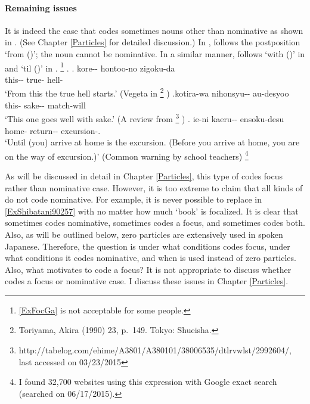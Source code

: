 \paragraph{Remaining issues}

It is indeed the case that
 codes sometimes nouns other than nominative
as shown in \Next.
(See Chapter \ref{Particles} for detailed discussion.)
In \Next[a],  follows the postposition  `from ()';
the noun cannot be nominative.
In a similar manner,
 follows  `with ()' in \Next[b] and
 `til ()' in \Next[c].%
 \footnote{\ref{ExFocGa} is not acceptable for some people.}
%
\ex.
 \ag. kore-- hontoo-no zigoku-da \\
      this-- true- hell- \\
      `From this the true hell starts.'
      \hfill{(Vegeta in %
      \footnote{
      Toriyama, Akira (1990)  23, p.~149. Tokyo: Shueisha.
      }
      )}
 \bg.\label{ExFocGa}kotira-wa nihonsyu-- au-desyoo \\
      this- sake-- match-will \\
      `This one goes well with sake.'
      \hfill{(A review from %
       \footnote{http://tabelog.com/ehime/A3801/A380101/38006535/dtlrvwlst/2992604/, last accessed on 03/23/2015}
      )}
  \bg. ie-ni kaeru-- ensoku-desu \\
       home- return-- excursion-. \\
       `Until (you) arrive at home is the excursion. (Before you arrive at home, you are on the way of excursion.)'
       \hfill{(Common warning by school teachers)}%
       \footnote{
       I found 32,700 websites using this expression with Google exact search (searched on 06/17/2015).
       }

As will be discussed in detail in Chapter \ref{Particles},
this type of  codes focus rather than nominative case.
However, it is too extreme to claim that all kinds of  do not code nominative.
For example, it is never possible to replace
 in \ref{ExShibatani90257} with 
no matter how much  `book' is focalized.
It is clear that  sometimes codes nominative, sometimes codes a focus, and sometimes codes both.
Also, as will be outlined below,
zero particles are extensively used in spoken Japanese.
Therefore, the question is under what conditions  codes focus,
under what conditions it codes nominative,
and when  is used instead of zero particles.
Also, what motivates  to code a focus?
It is not appropriate to discuss
whether  codes a focus or nominative case.
I discuss these issues in Chapter \ref{Particles}.



